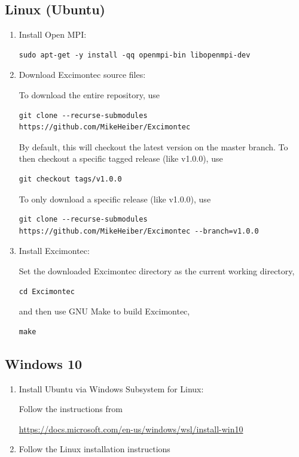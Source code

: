 \documentclass[%
 reprint,onecolumn,notitlepage,
superscriptaddress,longbibliography,
 amsmath,amssymb,
 aps,rmp,floatfix,
]{revtex4-1}
\begin{document}
\subsection{Linux (Ubuntu)}

\begin{enumerate}
\item Install Open MPI:
\begin{verbatim}
sudo apt-get -y install -qq openmpi-bin libopenmpi-dev
\end{verbatim}

\item Download Excimontec source files:
    
To download the entire repository, use
\begin{verbatim}
git clone --recurse-submodules https://github.com/MikeHeiber/Excimontec
\end{verbatim}
By default, this will checkout the latest version on the master branch. 
To then checkout a specific tagged release (like v1.0.0), use
\begin{verbatim}
git checkout tags/v1.0.0
\end{verbatim}
To only download a specific release (like v1.0.0), use 
\begin{verbatim}
git clone --recurse-submodules https://github.com/MikeHeiber/Excimontec --branch=v1.0.0
\end{verbatim}

\item Install Excimontec:
    
Set the downloaded Excimontec directory as the current working directory,
\begin{verbatim}
cd Excimontec
\end{verbatim}
and then use GNU Make to build Excimontec,
\begin{verbatim}
make
\end{verbatim}
\end{enumerate}

\subsection{Windows 10}

\begin{enumerate}
    \item Install Ubuntu via Windows Subsystem for Linux:
    
    Follow the instructions from
    
    \url{https://docs.microsoft.com/en-us/windows/wsl/install-win10}
    
    \item Follow the Linux installation instructions
\end{enumerate}
\end{document}
